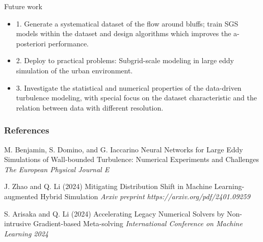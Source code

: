 \documentclass[paper slide]{beamer}
\begin{document}
\begin{frame}{Future work}
	\begin{itemize}
		\item 1. Generate a systematical dataset of the flow around bluffs; train SGS models within the dataset and design algorithms
		which improves the a-posteriori performance.
		\item 2. Deploy to practical problems: Subgrid-scale modeling in large eddy simulation of the
		urban environment.
		\item 3. Investigate the statistical and numerical properties of the data-driven turbulence modeling, with
		special focus on the dataset characteristic and the relation between data with different resolution.
	\end{itemize}
\end{frame}

\begin{frame} %
    \frametitle{References}
 
    \begin{thebibliography}{99} %
        \footnotesize %
 
		M. Benjamin, S. Domino, and G. Iaccarino
		\newblock Neural Networks for Large Eddy Simulations of Wall-bounded Turbulence: Numerical Experiments and Challenges
		\newblock \emph{The European Physical Journal E}

        J. Zhao and Q. Li (2024)
        \newblock Mitigating Distribution Shift in Machine Learning-augmented Hybrid Simulation
        \newblock \emph{Arxiv preprint https://arxiv.org/pdf/2401.09259}

        S. Arisaka and Q. Li (2024)
        \newblock Accelerating Legacy Numerical Solvers by Non-intrusive Gradient-based Meta-solving
        \newblock \emph{International Conference on Machine Learning 2024}
 
        
    \end{thebibliography}
\end{frame}
\end{document}

